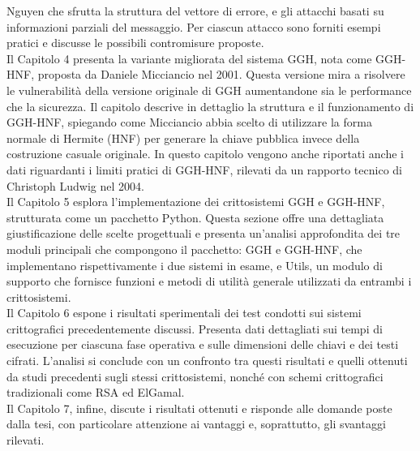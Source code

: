 Nguyen che sfrutta la struttura del vettore di errore, e gli attacchi basati su 
informazioni parziali del messaggio. Per ciascun attacco sono forniti esempi pratici e 
discusse le possibili contromisure proposte. \\
Il Capitolo 4 presenta la variante migliorata del sistema GGH, nota come GGH-HNF, 
proposta da Daniele Micciancio nel 2001. Questa versione mira a risolvere le 
vulnerabilità della versione originale di GGH aumentandone sia le performance che la 
sicurezza. Il capitolo descrive in dettaglio la struttura e il funzionamento di GGH-HNF, 
spiegando come Micciancio abbia scelto di utilizzare la forma normale di Hermite (HNF) 
per generare la chiave pubblica invece della costruzione casuale originale. 
In questo capitolo vengono anche riportati anche i dati riguardanti i limiti pratici di 
GGH-HNF, rilevati da un rapporto tecnico di Christoph Ludwig nel 2004. \\
Il Capitolo 5 esplora l'implementazione dei crittosistemi GGH e GGH-HNF, strutturata 
come un pacchetto Python. Questa sezione offre una dettagliata giustificazione delle 
scelte progettuali e presenta un'analisi approfondita dei tre moduli principali che 
compongono il pacchetto: GGH e GGH-HNF, che implementano rispettivamente i due sistemi 
in esame, e Utils, un modulo di supporto che fornisce funzioni e metodi di 
utilità generale utilizzati da entrambi i crittosistemi. \\
Il Capitolo 6 espone i risultati sperimentali dei test condotti sui sistemi crittografici 
precedentemente discussi. Presenta dati dettagliati sui tempi di esecuzione per ciascuna 
fase operativa e sulle dimensioni delle chiavi e dei testi cifrati. L'analisi si conclude 
con un confronto tra questi risultati e quelli ottenuti da studi precedenti sugli stessi 
crittosistemi, nonché con schemi crittografici tradizionali come RSA ed ElGamal. \\
Il Capitolo 7, infine, discute i risultati ottenuti e risponde alle domande poste dalla 
tesi, con particolare attenzione ai vantaggi e, soprattutto, gli svantaggi rilevati. 